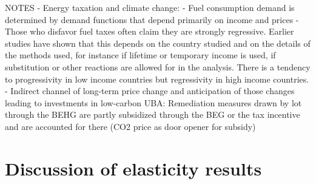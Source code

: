 \documentclass[12pt,twoside]{reedthesis}
\begin{document}
NOTES - Energy taxation and climate change:
- Fuel consumption demand is determined by demand functions that depend primarily on income and prices
- Those who disfavor fuel taxes often claim they are strongly regressive. Earlier studies have shown that this depends on the country studied and on the details of the methods used, for instance if lifetime or temporary income is used, if substitution or other reactions are allowed for in the analysis. There is a tendency to progressivity in low income countries but regressivity in high income countries.
- Indirect channel of long-term price change and anticipation of those changes leading to investments in low-carbon UBA: Remediation measures drawn by lot through the BEHG are partly subsidized through the BEG or the tax incentive and are accounted for there (CO2 price as door opener for subsidy)

\hypertarget{discussion-of-elasticity-results}{%
\section{Discussion of elasticity results}\label{discussion-of-elasticity-results}}
\end{document}
